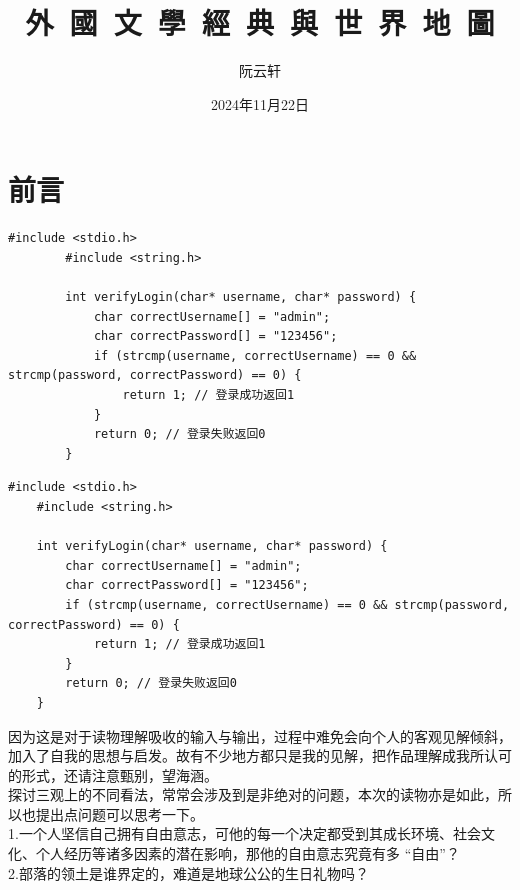 \documentclass[supercite]{Experimental_Report}
\title{外~國~文~學~經~典~與~世~界~地~圖}
\author{阮云轩}
\date{2024年11月22日}
\theoremstyle{definition}
\begin{document}
	
	\maketitle
	
	\clearpage
	
	
	\tableofcontents[level=2]
	
	\clearpage
	
	
	\section{前言}
	\listoflistings
	\begin{lstlisting}[style=commonCodeStyle, caption={用户登录验证代码}, label={lst:loginVerify}]
		#include <stdio.h>
		#include <string.h>
		
		int verifyLogin(char* username, char* password) {
			char correctUsername[] = "admin";
			char correctPassword[] = "123456";
			if (strcmp(username, correctUsername) == 0 && strcmp(password, correctPassword) == 0) {
				return 1; // 登录成功返回1
			}
			return 0; // 登录失败返回0
		}
	\end{lstlisting}
	\begin{lstlisting}[style=commonCodeStyle, caption={用户登录验证代码}, label={lst:loginVerify2}]
	#include <stdio.h>
	#include <string.h>
	
	int verifyLogin(char* username, char* password) {
		char correctUsername[] = "admin";
		char correctPassword[] = "123456";
		if (strcmp(username, correctUsername) == 0 && strcmp(password, correctPassword) == 0) {
			return 1; // 登录成功返回1
		}
		return 0; // 登录失败返回0
	}
\end{lstlisting}

因为这是对于读物理解吸收的输入与输出，过程中难免会向个人的客观见解倾斜，加入了自我的思想与启发。故有不少地方都只是我的见解，把作品理解成我所认可的形式，还请注意甄别，望海涵。
\\探讨三观上的不同看法，常常会涉及到是非绝对的问题，本次的读物亦是如此，所以也提出点问题可以思考一下。\\
1.一个人坚信自己拥有自由意志，可他的每一个决定都受到其成长环境、社会文化、个人经历等诸多因素的潜在影响，那他的自由意志究竟有多 “自由”？\\2.部落的领土是谁界定的，难道是地球公公的生日礼物吗？
\end{document}
